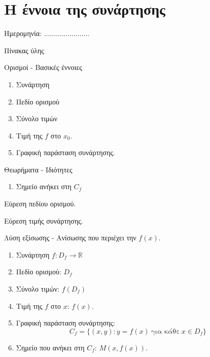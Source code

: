 \documentclass[twoside,nofonts,internet,math,spyros]{frontisthrio}
\newcommand{\myitem}{\stepcounter{enumi}\item[\raisebox{0.5mm}{\faExclamationTriangle}\ \Large$\square$]}
\begin{document}
\section{Η έννοια της συνάρτησης}
\begin{flushright}
\faCalendar* Ημερομηνία: .......................
\end{flushright}
\begin{mybox}[mysubtitle]{Πίνακας ύλης}
\begin{tcbraster}[raster columns=2,raster equal height]
\begin{myleftbox}{Ορισμοί - Βασικές έννοιες\ \ \faBook}
\begin{enumerate}[itemsep=0mm]
\item Συνάρτηση
\item Πεδίο ορισμού
\item Σύνολο τιμών
\item Τιμή της $ f $ στο $x_0$.
\item Γραφική παράσταση συνάρτησης.
\end{enumerate}
\end{myleftbox}
\begin{myrightbox}{Θεωρήματα - Ιδιότητες\ \ \faTools}
\begin{enumerate}[itemsep=0mm]
\item Σημείο ανήκει στη $C_f$
\end{enumerate}
\end{myrightbox}
\end{tcbraster}
\begin{multicols}{2}
\begin{todolist}[itemsep=0mm]
\myitem Εύρεση πεδίου ορισμού.
\item Εύρεση τιμής συνάρτησης.
\item Λύση εξίσωσης - Ανίσωσης που περιέχει την $f(x)$.
\end{todolist}
\end{multicols}
\begin{multicols}{2}
\begin{enumerate}[itemsep=0mm]
\item Συνάρτηση $f:D_f\to \mathbb{R}$
\item Πεδίο ορισμού: $D_f$
\item Σύνολο τιμών: $f(D_f)$
\item Τιμή της $f$ στο $x$: $f(x)$.
\item Γραφική παράσταση συνάρτησης: \[C_f=\{(x,y):y=f(x)\ \textrm{για κάθε}\ x\in D_f\} \]
\item Σημείο που ανήκει στη $C_f$: $M(x,f(x))$.
\end{enumerate}
\end{multicols}
\end{mybox}
\end{document}
